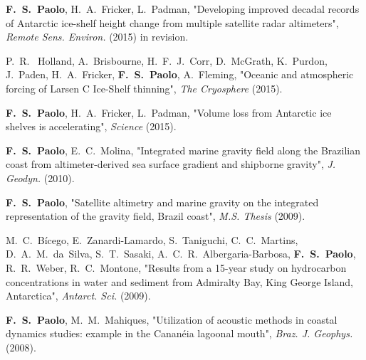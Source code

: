\begin{frontmatter}
\begin{vitapage}
\begin{publications}
  \item {\bf F.~S.~Paolo}, H.~A.~Fricker, L.~Padman, "Developing improved
        decadal records of Antarctic ice-shelf height change from multiple
        satellite radar altimeters", \emph{Remote Sens. Environ.} (2015) in revision.
  \item P.~R.~ Holland, A.~Brisbourne, H.~F.~J.~Corr, D.~McGrath, K.~Purdon, 
        J.~Paden, H.~A.~Fricker, {\bf F.~S.~Paolo}, A.~Fleming, "Oceanic and 
        atmospheric forcing of Larsen C Ice-Shelf thinning", \emph{The Cryosphere} 
        (2015).
  \item {\bf F.~S.~Paolo}, H.~A.~Fricker, L.~Padman, "Volume loss 
        from Antarctic ice shelves is accelerating", \emph{Science} (2015).
  \item {\bf F.~S.~Paolo}, E.~C.~Molina, "Integrated marine 
        gravity field along the Brazilian coast from altimeter-derived sea 
        surface gradient and shipborne gravity", \emph{J. Geodyn.} (2010).
  \item {\bf F.~S.~Paolo}, "Satellite altimetry and marine gravity on the
        integrated representation of the gravity field, Brazil coast",
        {\it M.S. Thesis} (2009).
  \item M.~C.~B\'icego, E.~Zanardi-Lamardo, S.~Taniguchi, C.~C.~Martins, 
        D.~A.~M.~da~Silva, S.~T.~Sasaki, A.~C.~R.~Albergaria-Barbosa, {\bf F.~S.~Paolo},
        R.~R.~Weber, R.~C.~Montone, "Results from a 15-year 
        study on hydrocarbon concentrations in water and sediment from 
        Admiralty Bay, King George Island, Antarctica", \emph{Antarct. Sci.} 
        (2009).
  \item {\bf F.~S.~Paolo}, M.~M.~Mahiques, "Utilization of 
        acoustic methods in coastal dynamics studies: example in the 
        Canan\'eia lagoonal mouth", \emph{Braz. J. Geophys.} (2008).
\end{publications}


\end{vitapage}
\end{frontmatter}
